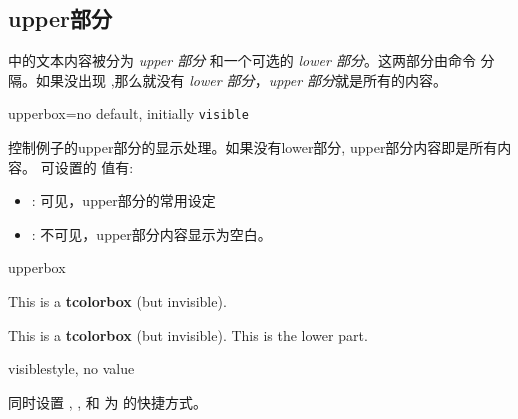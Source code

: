 \subsection{upper部分}

中的文本内容被分为 \emph{upper 部分} 和一个可选的 \emph{lower 部分}。这两部分由命令 分隔。如果没出现  ,那么就没有 \emph{lower 部分}，\emph{upper 部分}就是所有的内容。

\begin{docTcbKey}[][doc new=2015-01-06]{upperbox}{=}{no default, initially \texttt{visible}}

控制例子的upper部分的显示处理。如果没有lower部分, upper部分内容即是所有内容。
可设置的  值有:
\begin{itemize}
\item{}:%
可见，upper部分的常用设定
\item{}: %
不可见，upper部分内容显示为空白。
\end{itemize}
\begin{exdispExample}{upperbox}
\begin{tcolorbox}[upperbox=invisible,colback=white%
  ,title=upperbox设置为invisible且没有lower部分]
This is a \textbf{tcolorbox} (but invisible).
\end{tcolorbox}

\begin{tcolorbox}[upperbox=invisible,colback=white%
  ,title=upperbox设置为invisible时只显示lower部分]
This is a \textbf{tcolorbox} (but invisible).
\tcblower
This is the lower part.
\end{tcolorbox}
\end{exdispExample}
\end{docTcbKey}


\begin{docTcbKey}[][doc new and updated={2015-01-06}{2019-03-01}]{visible}{}{style, no value}

同时设置 , , 和  为  的快捷方式。
\end{docTcbKey}

